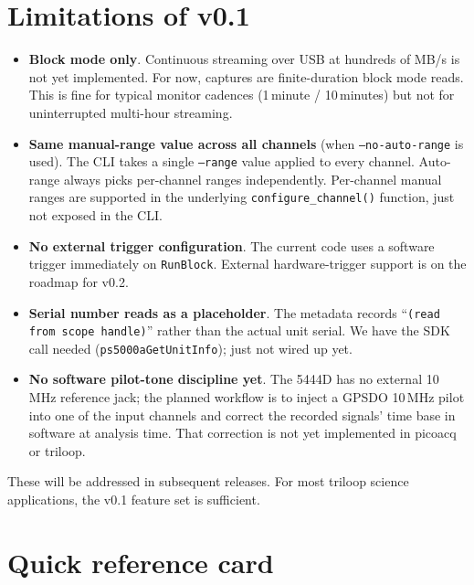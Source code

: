 \documentclass[11pt]{article}
\begin{document}
\section{Limitations of v0.1}

\begin{itemize}\itemsep=2pt
\item \textbf{Block mode only}.  Continuous streaming over USB at
      hundreds of MB/s is not yet implemented.  For now, captures are
      finite-duration block mode reads.  This is fine for typical
      monitor cadences (1\,minute / 10\,minutes) but not for
      uninterrupted multi-hour streaming.
\item \textbf{Same manual-range value across all channels} (when
      \texttt{--no-auto-range} is used).  The CLI takes a single
      \texttt{--range} value applied to every channel.  Auto-range
      always picks per-channel ranges independently.  Per-channel
      manual ranges are supported in the underlying
      \texttt{configure\_channel()} function, just not exposed in the
      CLI.
\item \textbf{No external trigger configuration}.  The current code
      uses a software trigger immediately on \texttt{RunBlock}.
      External hardware-trigger support is on the roadmap for v0.2.
\item \textbf{Serial number reads as a placeholder}.  The metadata
      records ``\texttt{(read from scope handle)}'' rather than the
      actual unit serial.  We have the SDK call needed
      (\texttt{ps5000aGetUnitInfo}); just not wired up yet.
\item \textbf{No software pilot-tone discipline yet}.  The 5444D has
      no external 10\,MHz reference jack; the planned workflow is to
      inject a GPSDO 10\,MHz pilot into one of the input channels and
      correct the recorded signals' time base in software at analysis
      time.  That correction is not yet implemented in
      \textsf{picoacq} or \textsf{triloop}.
\end{itemize}

These will be addressed in subsequent releases.  For most triloop
science applications, the v0.1 feature set is sufficient.

\section{Quick reference card}
\end{document}
